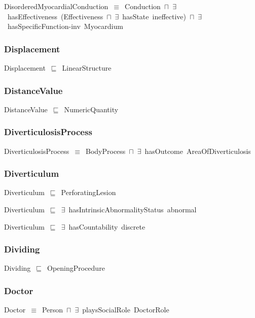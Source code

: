 \documentclass{article}
\begin{document}
DisorderedMyocardialConduction~\ensuremath{\equiv}~Conduction~\ensuremath{\sqcap}~\ensuremath{\exists}~hasEffectiveness~(Effectiveness~\ensuremath{\sqcap}~\ensuremath{\exists}~hasState~ineffective)~\ensuremath{\sqcap}~\ensuremath{\exists}~hasSpecificFunction-inv~Myocardium

\subsubsection*{Displacement}

Displacement~\ensuremath{\sqsubseteq}~LinearStructure~

\subsubsection*{DistanceValue}

DistanceValue~\ensuremath{\sqsubseteq}~NumericQuantity~

\subsubsection*{DiverticulosisProcess}

DiverticulosisProcess~\ensuremath{\equiv}~BodyProcess~\ensuremath{\sqcap}~\ensuremath{\exists}~hasOutcome~AreaOfDiverticulosis

\subsubsection*{Diverticulum}

Diverticulum~\ensuremath{\sqsubseteq}~PerforatingLesion~

Diverticulum~\ensuremath{\sqsubseteq}~\ensuremath{\exists}~hasIntrinsicAbnormalityStatus~abnormal~

Diverticulum~\ensuremath{\sqsubseteq}~\ensuremath{\exists}~hasCountability~discrete~

\subsubsection*{Dividing}

Dividing~\ensuremath{\sqsubseteq}~OpeningProcedure~

\subsubsection*{Doctor}

Doctor~\ensuremath{\equiv}~Person~\ensuremath{\sqcap}~\ensuremath{\exists}~playsSocialRole~DoctorRole
\end{document}
